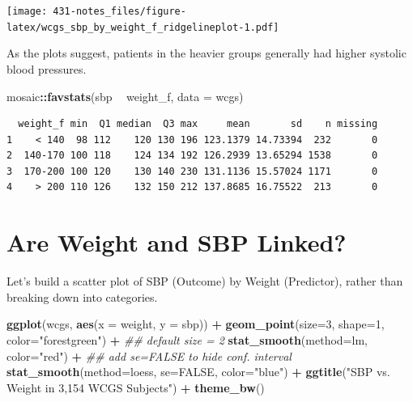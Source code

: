 \documentclass[
]{book}
\newenvironment{Shaded}{\begin{snugshade}}{\end{snugshade}}
\newcommand{\CommentTok}[1]{\textcolor[rgb]{0.56,0.35,0.01}{\textit{#1}}}
\newcommand{\DataTypeTok}[1]{\textcolor[rgb]{0.13,0.29,0.53}{#1}}
\newcommand{\DecValTok}[1]{\textcolor[rgb]{0.00,0.00,0.81}{#1}}
\newcommand{\KeywordTok}[1]{\textcolor[rgb]{0.13,0.29,0.53}{\textbf{#1}}}
\newcommand{\NormalTok}[1]{#1}
\newcommand{\OperatorTok}[1]{\textcolor[rgb]{0.81,0.36,0.00}{\textbf{#1}}}
\newcommand{\OtherTok}[1]{\textcolor[rgb]{0.56,0.35,0.01}{#1}}
\newcommand{\StringTok}[1]{\textcolor[rgb]{0.31,0.60,0.02}{#1}}
\begin{document}
\texttt{[image: 431-notes\_files/figure-latex/wcgs\_sbp\_by\_weight\_f\_ridgelineplot-1.pdf]}

As the plots suggest, patients in the heavier groups generally had higher systolic blood pressures.

\begin{Shaded}
\begin{Highlighting}[]
\NormalTok{mosaic}\OperatorTok{::}\KeywordTok{favstats}\NormalTok{(sbp }\OperatorTok{~}\StringTok{ }\NormalTok{weight_f, }\DataTypeTok{data =}\NormalTok{ wcgs)}
\end{Highlighting}
\end{Shaded}

\begin{verbatim}
  weight_f min  Q1 median  Q3 max     mean       sd    n missing
1    < 140  98 112    120 130 196 123.1379 14.73394  232       0
2  140-170 100 118    124 134 192 126.2939 13.65294 1538       0
3  170-200 100 120    130 140 230 131.1136 15.57024 1171       0
4    > 200 110 126    132 150 212 137.8685 16.75522  213       0
\end{verbatim}

\hypertarget{are-weight-and-sbp-linked}{%
\section{Are Weight and SBP Linked?}\label{are-weight-and-sbp-linked}}

Let's build a scatter plot of SBP (Outcome) by Weight (Predictor), rather than breaking down into categories.

\begin{Shaded}
\begin{Highlighting}[]
\KeywordTok{ggplot}\NormalTok{(wcgs, }\KeywordTok{aes}\NormalTok{(}\DataTypeTok{x =}\NormalTok{ weight, }\DataTypeTok{y =}\NormalTok{ sbp)) }\OperatorTok{+}
\StringTok{    }\KeywordTok{geom_point}\NormalTok{(}\DataTypeTok{size=}\DecValTok{3}\NormalTok{, }\DataTypeTok{shape=}\DecValTok{1}\NormalTok{, }\DataTypeTok{color=}\StringTok{"forestgreen"}\NormalTok{) }\OperatorTok{+}\StringTok{ }\CommentTok{## default size = 2}
\StringTok{    }\KeywordTok{stat_smooth}\NormalTok{(}\DataTypeTok{method=}\NormalTok{lm, }\DataTypeTok{color=}\StringTok{"red"}\NormalTok{) }\OperatorTok{+}\StringTok{ }\CommentTok{## add se=FALSE to hide conf. interval}
\StringTok{    }\KeywordTok{stat_smooth}\NormalTok{(}\DataTypeTok{method=}\NormalTok{loess, }\DataTypeTok{se=}\OtherTok{FALSE}\NormalTok{, }\DataTypeTok{color=}\StringTok{"blue"}\NormalTok{) }\OperatorTok{+}
\StringTok{    }\KeywordTok{ggtitle}\NormalTok{(}\StringTok{"SBP vs. Weight in 3,154 WCGS Subjects"}\NormalTok{) }\OperatorTok{+}\StringTok{ }
\StringTok{    }\KeywordTok{theme_bw}\NormalTok{()}
\end{Highlighting}
\end{Shaded}
\end{document}
